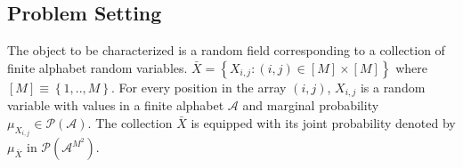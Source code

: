\subsection{Problem Setting}
The object to be characterized is a random field corresponding to a collection of finite alphabet random variables. $\bar{X}= \left\{X_{i,j}: (i,j)\in [M]\times [M] \right\}$ where $[M] \equiv \left\{1,..,M\right\}$. %
For every position in the array $(i,j)$, $X_{i,j}$ is a random variable with values in a finite alphabet $\mathcal{A}$ and marginal probability $\mu_{X_{i,j}} \in \mathcal{P}(\mathcal{A})$. The collection $\bar{X}$ %
is equipped with its joint probability denoted by $\mu_{\bar{X}}$ in $\mathcal{P}(\mathcal{A}^{M^2})$.

